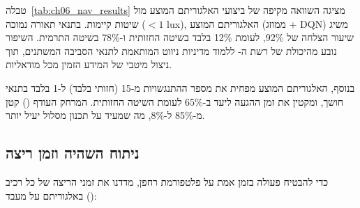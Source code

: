 \begin{table}[htbp]
\centering
\caption{השוואת ביצועי ניווט בשיטות שונות בתנאי תאורה משתנים. (Navigation performance comparison across different methods under varying illumination.)}
\label{tab:ch06_nav_results}
\end{table}

טבלה~\ref{tab:ch06_nav_results} מציגה השוואה מקיפה של ביצועי האלגוריתם המוצע מול שיטות קיימות. בתנאי תאורה נמוכה ($<1$ lux), האלגוריתם המוצע (ממוזג + DQN) משיג שיעור הצלחה של 92\%, לעומת 12\% בלבד בשיטה החזותית ו-78\% בשיטה התרמית. השיפור נובע מהיכולת של רשת ה- ללמוד מדיניות ניווט המותאמת לתנאי הסביבה המשתנים, תוך ניצול מיטבי של המידע הזמין מכל מודאליות.

בנוסף, האלגוריתם המוצע מפחית את מספר ההתנגשויות מ-15 (חזותי בלבד) ל-1 בלבד בתנאי חושך, ומקטין את זמן ההגעה ליעד ב-65\% לעומת השיטה החזותית. המרחק העודף () קטן מ-85\% ל-8\%, מה שמעיד על תכנון מסלול יעיל יותר.

\subsection{ניתוח השהיה וזמן ריצה}
\label{sec:ch06_latency}

כדי להבטיח פעולה בזמן אמת על פלטפורמת רחפן, מדדנו את זמני הריצה של כל רכיב באלגוריתם על מעבד  ():

